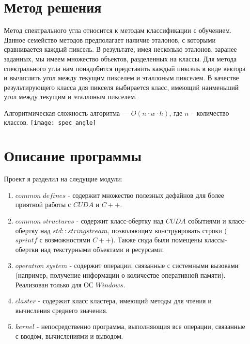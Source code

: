 \section{Метод решения}
Метод спектрального угла относится к методам классификации с обучением. Данное семейство методов предполагает наличие эталонов, 
с которыми сравнивается каждый пиксель. В результате, имея несколько эталонов, заранее заданных, мы имеем множество объектов, 
разделенных на классы. Для метода спектрального угла нам понадобится представить каждый пиксель в виде вектора и 
вычислить угол между текущим пикселем и эталлоным пикселем. В качестве результирующего класса для пикселя выбирается класс, 
имеющий наименьший угол между текущим и эталлоным пикселем.

Алгоритмическая сложность алгоритма --- $O(n \cdot w \cdot h)$, где $n$ -- количество классов.
\texttt{[image: spec\_angle]}

\section{Описание программы}
Проект я разделил на следущие модули:
\begin{enumerate}
    \item $common \; defines$ - содержит множество полезных дефайнов для более приятной работы с $CUDA$ и $C++$.
    \item $common \; structures$ - содержит класс-обертку над $CUDA$ событиями и класс-обертку над $std\!::\!stringstream$, позволяющим конструировать строки ($sprintf$ с возможностями $C++$).
    Также сюда были помещены классы-обертки над текстурными объектами и ресурсами.
    \item $operation \; system$ - содержит операции, связанные с системными вызовами (например, получение информации о количестве оперативной памяти). Реализован только для ОС $Windows$.
    \item $claster$ - содержит класс кластера, имеющий методы для чтения и вычисления среднего значения.
    \item $kernel$ - непосредственно программа, выполняющия все операции, связанные с вводом, вычислениями и выводом.
\end{enumerate}

